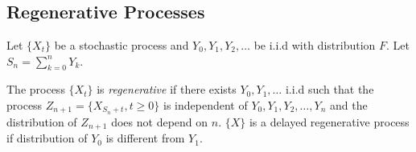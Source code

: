 \documentclass[all-lectures.tex]{subfiles}
\begin{document}

\setcounter{section}{5}
\setcounter{subsection}{0}

\section*{} %
\subsection{Regenerative Processes}
Let $\{X_t\}$ be a stochastic process and $Y_0,Y_1,Y_2,\dots$ be i.i.d with distribution $F$. Let $S_n = \sum_{k=0}^n Y_k$.
\begin{defn}
The process $\{X_t\}$ is \textit{regenerative }if there exists $Y_0,Y_1,\dots$ i.i.d such that the process $Z_{n+1} = \{X_{S_n +t}, t\geq 0\}$ is independent of $Y_0,Y_1,Y_2,\dots,Y_n$ and the distribution of $Z_{n+1}$ does not depend on $n$. $\{X\}$ is a delayed regenerative process if distribution of $Y_0$ is different from $Y_1$.
\end{defn}
\end{document}
